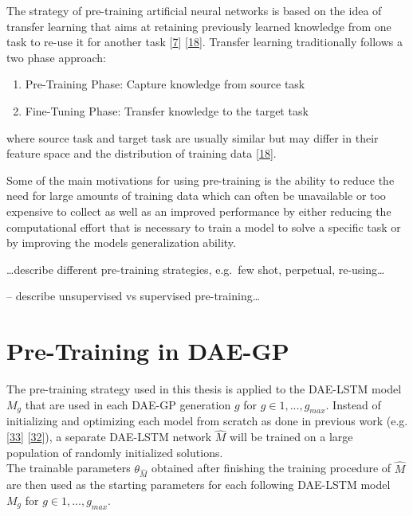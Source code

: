 \documentclass[
  11pt,
]{article}
\providecommand{\tightlist}{%
  \setlength{\itemsep}{0pt}\setlength{\parskip}{0pt}}
\begin{document}
The strategy of pre-training artificial neural networks is based on the idea of transfer learning that aims at retaining previously learned knowledge from one task to re-use it for another task {[}\protect\hyperlink{ref-HAN2021225}{7}{]} {[}\protect\hyperlink{ref-survey_transfer_learning}{18}{]}.
Transfer learning traditionally follows a two phase approach:

\begin{enumerate}
\def\labelenumi{\arabic{enumi}.}
\tightlist
\item
  Pre-Training Phase: Capture knowledge from source task
\item
  Fine-Tuning Phase: Transfer knowledge to the target task
\end{enumerate}

where source task and target task are usually similar but may differ in their feature space and the distribution of training data {[}\protect\hyperlink{ref-survey_transfer_learning}{18}{]}.

Some of the main motivations for using pre-training is the ability to reduce the need for large amounts of training data which can often be unavailable or too expensive to collect as well as an improved performance by either reducing the computational effort that is necessary to train a model to solve a specific task or by improving the models generalization ability.

\ldots describe different pre-training strategies, e.g.~few shot, perpetual, re-using\ldots{}

-- describe unsupervised vs supervised pre-training\ldots{}

\hypertarget{pre-training-in-dae-gp}{%
\section{Pre-Training in DAE-GP}\label{pre-training-in-dae-gp}}

The pre-training strategy used in this thesis is applied to the DAE-LSTM model \(M_g\) that are used in each DAE-GP generation \(g\) for \(g\in{1,...,g_{max}}\).
Instead of initializing and optimizing each model from scratch as done in previous work (e.g. {[}\protect\hyperlink{ref-dae-gp_2020_rtree}{33}{]} {[}\protect\hyperlink{ref-dae-gp_2022_symreg}{32}{]}), a separate DAE-LSTM network \(\hat{M}\) will be trained on a large population of randomly initialized solutions.\\
The trainable parameters \(\theta_{\hat{M}}\) obtained after finishing the training procedure of \(\hat{M}\) are then used as the starting parameters for each following DAE-LSTM model \(M_g\) for \(g\in{1,...,g_{max}}\).
\end{document}
